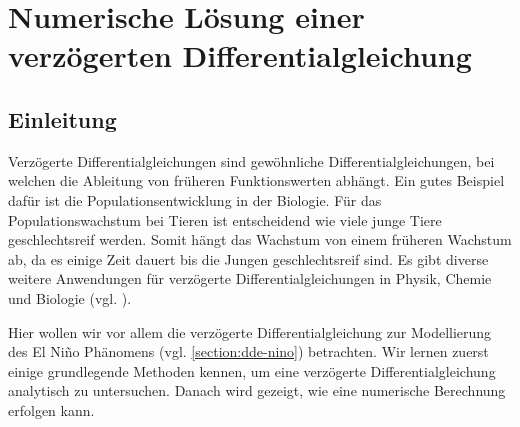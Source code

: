 %
%
%
\chapter{Numerische Lösung einer verzögerten Differentialgleichung\label{chapter:verzoegert}}
\begin{refsection}

\section{Einleitung}
Verzögerte Differentialgleichungen sind gewöhnliche Differentialgleichungen, bei welchen die Ableitung von früheren Funktionswerten abhängt.
Ein gutes Beispiel dafür ist die Populationsentwicklung in der Biologie. 
Für das Populationswachstum bei Tieren ist entscheidend wie viele junge Tiere geschlechtsreif werden.
Somit hängt das Wachstum von einem früheren Wachstum ab, da es einige Zeit dauert bis die Jungen geschlechtsreif sind.
Es gibt diverse weitere Anwendungen für verzögerte Differentialgleichungen in Physik, Chemie und Biologie (vgl. \cite{verzoegert:erneux}).

Hier wollen wir vor allem die verzögerte Differentialgleichung zur Modellierung des El Niño Phänomens (vgl. \ref{section:dde-nino}) betrachten.
Wir lernen zuerst einige grundlegende Methoden kennen, um eine verzögerte Differentialgleichung analytisch zu untersuchen. 
Danach wird gezeigt, wie eine numerische Berechnung erfolgen kann.






\printbibliography[heading=subbibliography]
\end{refsection}
